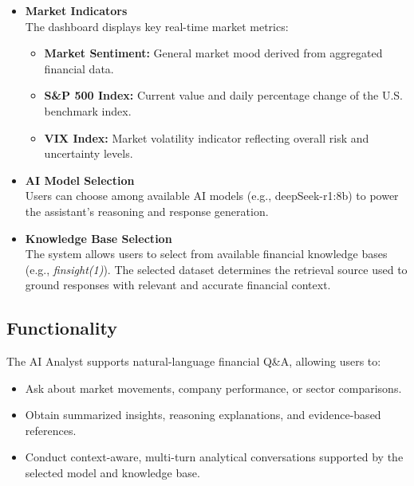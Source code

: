 \begin{itemize}
    \item \textbf{Market Indicators} \\
    The dashboard displays key real-time market metrics:
    \begin{itemize}
        \item \textbf{Market Sentiment:} General market mood derived from aggregated financial data.
        \item \textbf{S\&P 500 Index:} Current value and daily percentage change of the U.S. benchmark index.
        \item \textbf{VIX Index:} Market volatility indicator reflecting overall risk and uncertainty levels.
    \end{itemize}

    \item \textbf{AI Model Selection} \\
    Users can choose among available AI models (e.g., deepSeek-r1:8b) to power the assistant’s reasoning and response generation.

    \item \textbf{Knowledge Base Selection} \\
    The system allows users to select from available financial knowledge bases (e.g., \textit{finsight(1)}). 
    The selected dataset determines the retrieval source used to ground responses with relevant and accurate financial context.
\end{itemize}

\subsection{Functionality}

The AI Analyst supports natural-language financial Q\&A, allowing users to:
\begin{itemize}
    \item Ask about market movements, company performance, or sector comparisons.
    \item Obtain summarized insights, reasoning explanations, and evidence-based references.
    \item Conduct context-aware, multi-turn analytical conversations supported by the selected model and knowledge base.
\end{itemize}
